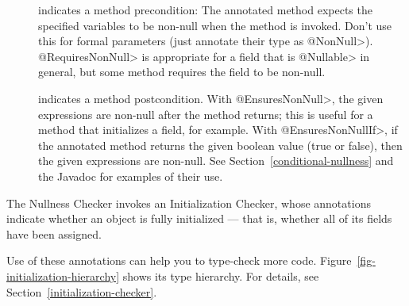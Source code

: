 \begin{description}

\item[]
  indicates a method precondition:  The annotated method expects the
  specified variables to be non-null when the
  method is invoked.  Don't use this for formal parameters (just annotate
  their type as \<@NonNull>).  \<@RequiresNonNull> is appropriate for
  a field that is \<@Nullable> in general, but some method requires the
  field to be non-null.

\item[]
\item[]
  indicates a method postcondition.  With \<@EnsuresNonNull>, the given
  expressions are non-null after the method returns; this is useful for a
  method that initializes a field, for example.  With
  \<@EnsuresNonNullIf>, if the annotated
  method returns the given boolean value (true or false), then the given
  expressions are non-null.  See Section~\ref{conditional-nullness} and the
  Javadoc for examples of their use.

\end{description}



The Nullness Checker invokes an Initialization Checker, whose annotations indicate whether
an object is fully initialized --- that is, whether all of its fields have
been assigned.

\begin{description}
\item[]
\item[]
\item[]
\item[]
\end{description}

\noindent
Use of these annotations can help you to type-check more
code.  Figure~\ref{fig-initialization-hierarchy} shows its type hierarchy.  For
details, see Section~\ref{initialization-checker}.



